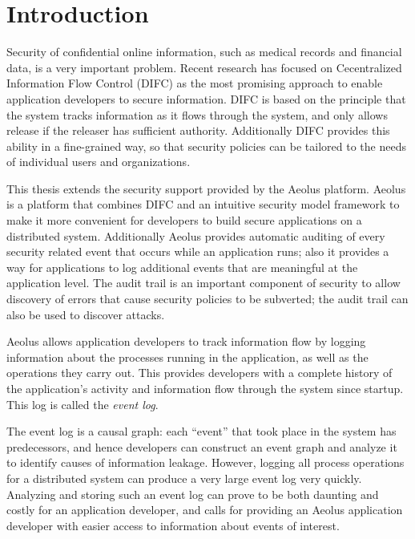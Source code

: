 \chapter{Introduction}

Security of confidential online information, such as medical records and financial data, is a very important problem. Recent research has focused on Cecentralized Information Flow Control (DIFC) as the most promising approach to enable application developers to secure information. DIFC is based on the principle that the system tracks information as it flows through the system, and only allows release if the releaser has sufficient authority. Additionally DIFC provides this ability in a fine-grained way, so that security policies can be tailored to the needs of individual users and organizations.

This thesis extends the security support provided by the Aeolus platform. Aeolus is a platform that combines DIFC and an intuitive security model framework to make it more convenient for developers to build secure applications on a distributed system. Additionally Aeolus provides automatic auditing of every security related event that occurs while an application runs; also it provides a way for applications to log additional events that are meaningful at the application level. The audit trail is an important component of security to allow discovery of errors that cause security policies to be subverted; the audit trail can also be used to discover attacks.

Aeolus allows application developers to track information flow by logging information about the processes running in the application, as well as the operations they carry out. This provides developers with a complete history of the application's activity and information flow through the system since startup. This log is called the \emph{event log}.

The event log is a causal graph: each ``event'' that took place in the system has predecessors, and hence developers can construct an event graph and analyze it to identify causes of information leakage. However, logging all process operations for a distributed system can produce a very large event log very quickly. Analyzing and storing such an event log can prove to be both daunting and costly for an application developer, and calls for providing an Aeolus application developer with easier access to information about events of interest.

